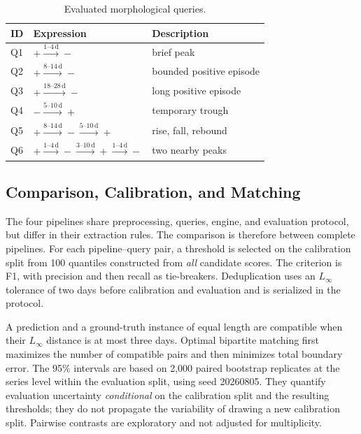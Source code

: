 \documentclass[11pt,a4paper]{article}
\begin{document}
\begin{table}[H]
\centering
\caption{Evaluated morphological queries.}
\label{tab:queries}
\small
\begin{tabularx}{\textwidth}{@{}p{1.1cm}p{5.2cm}X@{}}
\toprule
ID & Expression & Description \\
\midrule
Q1 & $+\xrightarrow{1\text{--}4\,\mathrm{d}}-$ & brief peak \\
Q2 & $+\xrightarrow{8\text{--}14\,\mathrm{d}}-$ & bounded positive episode \\
Q3 & $+\xrightarrow{18\text{--}28\,\mathrm{d}}-$ & long positive episode \\
Q4 & $-\xrightarrow{5\text{--}10\,\mathrm{d}}+$ & temporary trough \\
Q5 & $+\xrightarrow{8\text{--}14\,\mathrm{d}}-\xrightarrow{5\text{--}10\,\mathrm{d}}+$ & rise, fall, rebound \\
Q6 & $+\xrightarrow{1\text{--}4\,\mathrm{d}}-\xrightarrow{3\text{--}10\,\mathrm{d}}+\xrightarrow{1\text{--}4\,\mathrm{d}}-$ & two nearby peaks \\
\bottomrule
\end{tabularx}
\end{table}

\subsection{Comparison, Calibration, and Matching}

The four pipelines share preprocessing, queries, engine, and evaluation protocol, but differ in their extraction rules. The comparison is therefore between complete pipelines. For each pipeline--query pair, a threshold is selected on the calibration split from 100 quantiles constructed from \emph{all} candidate scores. The criterion is F1, with precision and then recall as tie-breakers. Deduplication uses an $L_\infty$ tolerance of two days before calibration and evaluation and is serialized in the protocol.

A prediction and a ground-truth instance of equal length are compatible when their $L_\infty$ distance is at most three days. Optimal bipartite matching first maximizes the number of compatible pairs and then minimizes total boundary error. The 95\% intervals are based on 2,000 paired bootstrap replicates at the series level within the evaluation split, using seed 20260805. They quantify evaluation uncertainty \emph{conditional} on the calibration split and the resulting thresholds; they do not propagate the variability of drawing a new calibration split. Pairwise contrasts are exploratory and not adjusted for multiplicity.
\end{document}
